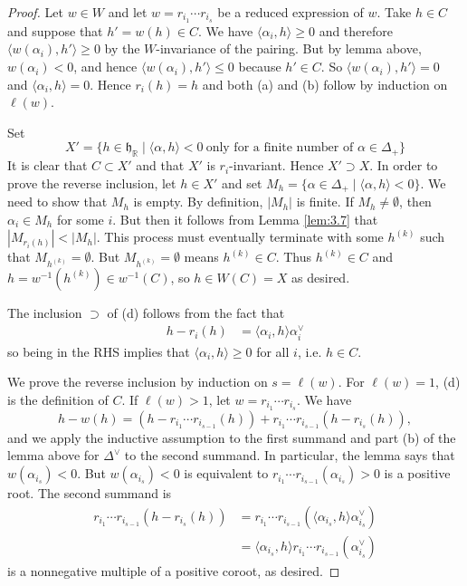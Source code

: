\documentclass[12pt]{article}
\begin{document}
\begin{proof}
Let $w \in W$ and let $w = r_{i_1}\cdots r_{i_s}$ be a reduced expression of $w$. 
Take $h \in C$ and suppose that $h' = w(h) \in C$. 
We have $\langle \alpha_i,h \rangle \geq 0$ and therefore 
$\langle w(\alpha_i),h' \rangle \geq 0$ by the $W$-invariance of the pairing. But by lemma above, $w(\alpha_i)<0$, and hence 
$\langle w(\alpha_i),h' \rangle \leq 0$ because $h' \in C$. So $\langle w(\alpha_i),h' \rangle = 0$ and $\langle \alpha_i,h \rangle = 0$. 
Hence $r_i(h) = h$ and both (a) and (b) follow by induction on $\ell(w)$.

Set \[X' = \{ h \in \mathfrak{h}_{\mathbb{R}} \mid \langle \alpha,h \rangle < 0 
\ \text{only for a finite number of } \alpha \in \Delta_+ \}\]
It is clear that $C \subset X'$ and that $X'$ is $r_i$-invariant. 
Hence $X' \supset X$. In order to prove the reverse inclusion, let $h \in X'$ 
and set $M_h = \{ \alpha \in \Delta_+ \mid \langle \alpha,h \rangle < 0 \}$. We need to show that $M_h$ is empty. By definition, $|M_h|$ is finite. If $M_h \neq \emptyset$, then $\alpha_i \in M_h$ 
for some $i$. But then it follows from Lemma \ref{lem:3.7} that $|M_{r_i(h)}| < |M_h|$. This process must eventually terminate with some $h^{(k)}$ such that $M_{h^{(k)}} = \emptyset$. But $M_{h^{(k)}} = \emptyset$ means $h^{(k)} \in C$. Thus $h^{(k)} \in C$ and $h = w^{-1}(h^{(k)}) \in w^{-1}(C)$, so $h \in W(C) = X$ as desired.

The inclusion $\supset$ of (d) follows from the fact that \begin{align*}
    h - r_i(h) &= \langle \alpha_i,h \rangle \alpha_i^\vee
\end{align*} so being in the RHS implies that $\langle \alpha_i,h \rangle \geq 0$ for all $i$, i.e. $h \in C$.


We prove the reverse inclusion by induction on $s=\ell(w)$. 
For $\ell(w)=1$, (d) is the definition of $C$. 
If $\ell(w)>1$, let $w=r_{i_1}\cdots r_{i_s}$. 
We have
\[
   h-w(h) = (h-r_{i_1}\cdots r_{i_{s-1}}(h)) + r_{i_1}\cdots r_{i_{s-1}}(h-r_{i_s}(h)),
\]
and we apply the inductive assumption to the first summand and part (b) of the lemma above for $\Delta^\vee$ to the second summand. In particular, the lemma says that $w(\alpha_{i_s})<0$.
But $w(\alpha_{i_s})<0$ is equivalent to
$r_{i_1}\cdots r_{i_{s-1}}(\alpha_{i_s}) > 0$ is a positive root. The second summand is \begin{align*}
    r_{i_1}\cdots r_{i_{s-1}}(h - r_{i_s}(h)) &= r_{i_1}\cdots r_{i_{s-1}}(\langle \alpha_{i_s}, h \rangle \alpha_{i_s}^\vee) \\
    &= \langle \alpha_{i_s}, h \rangle r_{i_1}\cdots r_{i_{s-1}}(\alpha_{i_s}^\vee)
\end{align*} is a nonnegative multiple of a positive coroot, as desired.


\end{proof}
\end{document}

